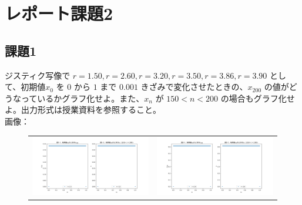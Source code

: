 \section{レポート課題2}
\subsection{課題1}
ジスティク写像で $r = 1.50, r = 2.60, r = 3.20, r = 3.50, r = 3.86, r = 3.90$ として、初期値$x_0$ を $0$ から $1$ まで $0.001$ きざみで変化させたときの、$x_{200}$ の値がどうなっているかグラフ化せよ。また、$x_n$ が $150 < n < 200$ の場合もグラフ化せよ。出力形式は授業資料を参照すること。\\
画像：\\
\begin{figure}[htbp]
  \begin{tabular}{cc}
    \begin{minipage}[t]{0.45\hsize}
      \centering
      \includegraphics[keepaspectratio, scale=0.25]{images/Problem2/ctest3_1.png}
    \end{minipage} &
    \begin{minipage}[t]{0.45\hsize}
      \centering
      \includegraphics[keepaspectratio, scale=0.25]{images/Problem2/ctest3_2.png}
    \end{minipage} \\


\end{tabular}
\end{figure}
